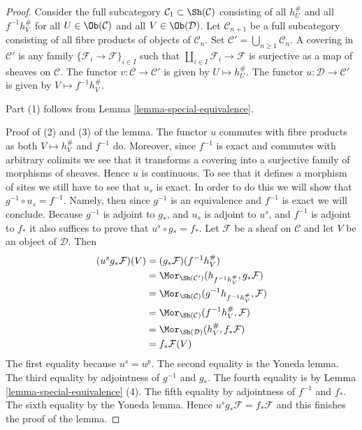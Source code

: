 \begin{proof}
Consider the full subcategory
$\mathcal{C}_1 \subset \Sh(\mathcal{C})$ consisting of all
$h_U^\#$ and all $f^{-1}h_V^\#$ for all
$U \in \Ob(\mathcal{C})$ and all $V \in \Ob(\mathcal{D})$.
Let $\mathcal{C}_{n + 1}$ be a full subcategory consisting of all
fibre products of objects of $\mathcal{C}_n$. Set
$\mathcal{C}' = \bigcup_{n \geq 1} \mathcal{C}_n$.
A covering in $\mathcal{C}'$ is any family
$\{\mathcal{F}_i \to \mathcal{F}\}_{i \in I}$ such that
$\coprod_{i \in I} \mathcal{F}_i \to \mathcal{F}$ is surjective
as a map of sheaves on $\mathcal{C}$.
The functor $v : \mathcal{C} \to \mathcal{C'}$ is given by
$U \mapsto h_U^\#$.
The functor $u : \mathcal{D} \to \mathcal{C'}$ is given by
$V \mapsto f^{-1}h_V^\#$.

\medskip\noindent
Part (1) follows from Lemma \ref{lemma-special-equivalence}.

\medskip\noindent
Proof of (2) and (3) of the lemma. The functor $u$ commutes with fibre
products as both $V \mapsto h_V^\#$ and $f^{-1}$ do. Moreover,
since $f^{-1}$ is exact and commutes with arbitrary colimits we see
that it transforms a covering into a surjective family of morphisms of
sheaves. Hence $u$ is continuous. To see that it defines a morphism of
sites we still have to see that $u_s$ is exact. In order to do this
we will show that $g^{-1} \circ u_s = f^{-1}$. Namely, then since $g^{-1}$
is an equivalence and $f^{-1}$ is exact we will conclude.
Because $g^{-1}$ is adjoint to $g_*$, and $u_s$ is adjoint to
$u^s$, and $f^{-1}$ is adjoint to $f_*$ it also suffices to prove that
$u^s \circ g_* = f_*$. Let $\mathcal{F}$ be a sheaf on $\mathcal{C}$
and let $V$ be an object of $\mathcal{D}$. Then
\begin{align*}
(u^s g_{\ast}\mathcal{F})(V)
& =
(g_{\ast}\mathcal{F})(f^{-1}h_V^\#) \\
& =
\Mor_{\Sh(\mathcal{C}')}(h_{f^{-1}h_V^\#},g_{\ast}\mathcal{F}) \\
& =
\Mor_{\Sh(\mathcal{C})}(g^{-1}h_{f^{-1}h_V^\#},\mathcal{F}) \\
& =
\Mor_{\Sh(\mathcal{C})}(f^{-1}h_V^\#,\mathcal{F}) \\
& =
\Mor_{\Sh(\mathcal{D})}(h_V^\#,f_{\ast}\mathcal{F}) \\
& =
f_{\ast}\mathcal{F}(V)
\end{align*}
The first equality because $u^s = u^p$.
The second equality is the Yoneda lemma.
The third equality by adjointness of $g^{-1}$ and $g_*$.
The fourth equality is by Lemma \ref{lemma-special-equivalence} (4).
The fifth equality by adjointness of $f^{-1}$ and $f_*$.
The sixth equality by the Yoneda lemma.
Hence $u^s g_*\mathcal{F} = f_*\mathcal{F}$ and
this finishes the proof of the lemma.
\end{proof}

